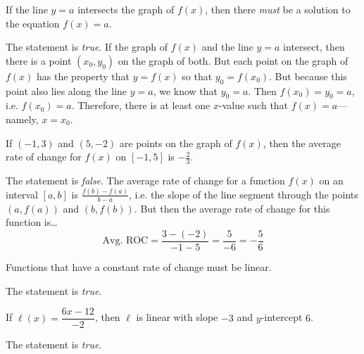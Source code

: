 \documentclass[11pt,letterpaper]{article}
\begin{document}
 If the line $y= a$ intersects the graph of $f(x)$, then there \textit{must} be a solution to the equation $f(x)= a$. \pspace

\sol The statement is \textit{true}. If the graph of $f(x)$ and the line $y= a$ intersect, then there is a point $(x_0, y_0)$ on the graph of both. But each point on the graph of $f(x)$ has the property that $y= f(x)$ so that $y_0= f(x_0)$. But because this point also lies along the line $y= a$, we know that $y_0= a$. Then $f(x_0)= y_0= a$, i.e. $f(x_0)= a$. Therefore, there is at least one $x$-value such that $f(x)= a$---namely, $x= x_0$. \pvspace{1.3cm}



 If $(-1, 3)$ and $(5, -2)$ are points on the graph of $f(x)$, then the average rate of change for $f(x)$ on $[-1, 5]$ is $-\frac{2}{3}$. \pspace

\sol The statement is \textit{false}. The average rate of change for a function $f(x)$ on an interval $[a, b]$ is $\frac{f(b) - f(a)}{b - a}$, i.e. the slope of the line segment through the points $(a, f(a))$ and $(b, f(b))$. But then the average rate of change for this function is\dots
	\[
	\text{Avg. ROC}= \dfrac{3 - (-2)}{-1 - 5}= \dfrac{5}{-6}= -\dfrac{5}{6}
	\] \pvspace{1.3cm}



 Functions that have a constant rate of change must be linear. \pspace

\sol The statement is \textit{true}. 


 If $\ell(x)= \dfrac{6x - 12}{-2}$, then $\ell$ is linear with slope $-3$ and $y$-intercept $6$. \pspace

\sol The statement is \textit{true}. 
\end{document}
